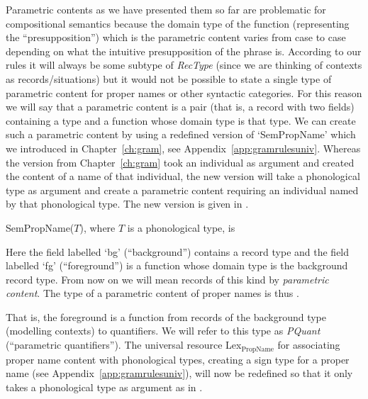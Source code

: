 Parametric contents as we have presented them so far are problematic
for compositional semantics because the domain type of the
function (representing the ``presupposition'') which is the parametric
content varies from case to case depending on what the intuitive
presupposition of the phrase is.  According to our rules it will
always be some subtype of \textit{RecType} (since we are thinking of
contexts as records/situations) but it would not be possible to state
a single type of parametric content for proper names or other
syntactic categories.  For this reason we will say that a parametric
content is a pair (that is, a record with two fields) containing a
type and a function whose domain type is that type.
We can create such a parametric content by using a redefined
version of `SemPropName' which we introduced in Chapter~\ref{ch:gram},
see Appendix~\ref{app:gramrulesuniv}.  Whereas the version from
Chapter~\ref{ch:gram} took an individual as argument and created the
content of a name of that individual, the new version will take a
phonological type as argument and create a parametric content
requiring an individual named by that phonological type.  The new
version is given in \nexteg{}.
\begin{ex} 
SemPropName($T$), where $T$ is a phonological type,
is

\label{ex:SemPropName-chpropnames} 
\end{ex}
Here the field labelled `bg' (``background'') contains a record type
and the field labelled `fg' (``foreground'') is a function whose
domain type is the background record type.  From now on we will mean
records of this kind by \textit{parametric content}.
The type of a parametric content of proper names is thus \nexteg{}.
\begin{ex}
\end{ex}
That is, the foreground is a function from
records of the  background type (modelling contexts) to quantifiers.  We will refer to this type as
\textit{PQuant} (``parametric quantifiers'').  The universal resource
Lex$_{\mathrm{PropName}}$ for associating proper name content with
phonological types, creating a sign type for a proper name (see Appendix~\ref{app:gramrulesuniv}), will now be
redefined so that it only takes a phonological type as argument as in
\nexteg{}.

